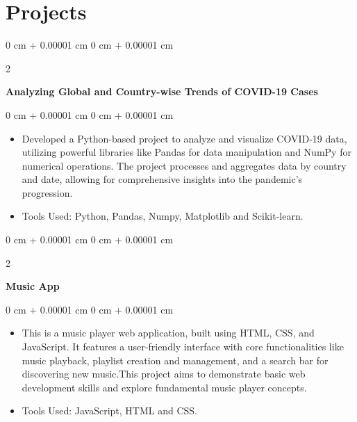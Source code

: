\documentclass[10pt, letterpaper]{article}
\newenvironment{highlights}{
    \begin{itemize}[
        topsep=0.10 cm,
        parsep=0.10 cm,
        partopsep=0pt,
        itemsep=0pt,
        leftmargin=0 cm + 10pt
    ]
}{
    \end{itemize}
} %
\newenvironment{onecolentry}{
    \begin{adjustwidth}{
        0 cm + 0.00001 cm
    }{
        0 cm + 0.00001 cm
    }
}{
    \end{adjustwidth}
} %
\newenvironment{twocolentry}[2][]{
    \onecolentry
    \def\secondColumn{#2}
    \setcolumnwidth{\fill, 4.5 cm}
    \begin{paracol}{2}
}{
    \switchcolumn \raggedleft \secondColumn
    \end{paracol}
    \endonecolentry
} %
\begin{document}
    
      
    \section{Projects}
                
        \begin{twocolentry}{
            
        }
            \textbf{Analyzing Global and Country-wise Trends of COVID-19 Cases}\\
            \vspace{0.1 cm}
        \end{twocolentry}
        \vspace{0.10 cm}
        \begin{onecolentry}
            \begin{highlights}
                \item Developed a Python-based project to analyze and visualize COVID-19 data, utilizing powerful libraries like Pandas for data manipulation and NumPy for numerical operations. The project processes and aggregates data by country and date, allowing for comprehensive insights into the pandemic's progression.
                \item Tools Used: Python, Pandas, Numpy, Matplotlib and Scikit-learn.
            \end{highlights}
        \end{onecolentry}


        \vspace{0.2 cm}

              \begin{twocolentry}{
            
        }
            \textbf{Music App}\\
            \vspace{0.1 cm}
        \end{twocolentry}
        \vspace{0.10 cm}
        \begin{onecolentry}
            \begin{highlights}
                \item This is a music player web application, built using HTML, CSS, and JavaScript. It features a user-friendly interface with core functionalities like music playback, playlist creation and management, and a search bar for discovering new music.This project aims to demonstrate basic web development skills and explore fundamental music player concepts.
                \item Tools Used: JavaScript, HTML and CSS.
            \end{highlights}
        \end{onecolentry}
\end{document}
